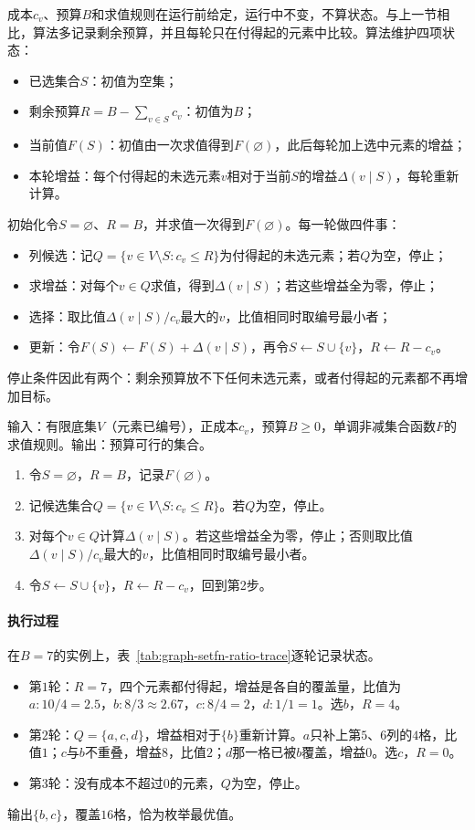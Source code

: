成本$c_v$、预算$B$和求值规则在运行前给定，运行中不变，不算状态。与上一节相比，算法多记录剩余预算，并且每轮只在付得起的元素中比较。算法维护四项状态：
\begin{itemize}
  \item 已选集合$S$：初值为空集；
  \item 剩余预算$R=B-\sum_{v\in S}c_v$：初值为$B$；
  \item 当前值$F(S)$：初值由一次求值得到$F(\varnothing)$，此后每轮加上选中元素的增益；
  \item 本轮增益：每个付得起的未选元素$v$相对于当前$S$的增益$\Delta(v\mid S)$，每轮重新计算。
\end{itemize}
初始化令$S=\varnothing$、$R=B$，并求值一次得到$F(\varnothing)$。每一轮做四件事：
\begin{itemize}
  \item 列候选：记$Q=\{v\in V\setminus S:c_v\leq R\}$为付得起的未选元素；若$Q$为空，停止；
  \item 求增益：对每个$v\in Q$求值，得到$\Delta(v\mid S)$；若这些增益全为零，停止；
  \item 选择：取比值$\Delta(v\mid S)/c_v$最大的$v$，比值相同时取编号最小者；
  \item 更新：令$F(S)\gets F(S)+\Delta(v\mid S)$，再令$S\gets S\cup\{v\}$，$R\gets R-c_v$。
\end{itemize}
停止条件因此有两个：剩余预算放不下任何未选元素，或者付得起的元素都不再增加目标。

\begin{algorithm}[预算约束下的单位成本贪心]
\label{alg:graph-setfn-ratio-greedy}
输入：有限底集$V$（元素已编号），正成本$c_v$，预算$B\geq0$，单调非减集合函数$F$的求值规则。输出：预算可行的集合。
\begin{enumerate}
  \item 令$S=\varnothing$，$R=B$，记录$F(\varnothing)$。
  \item 记候选集合$Q=\{v\in V\setminus S:c_v\leq R\}$。若$Q$为空，停止。
  \item 对每个$v\in Q$计算$\Delta(v\mid S)$。若这些增益全为零，停止；否则取比值$\Delta(v\mid S)/c_v$最大的$v$，比值相同时取编号最小者。
  \item 令$S\leftarrow S\cup\{v\}$，$R\leftarrow R-c_v$，回到第2步。
\end{enumerate}
\end{algorithm}

\paragraph{执行过程}
在$B=7$的实例上，表~\ref{tab:graph-setfn-ratio-trace}逐轮记录状态。
\begin{itemize}
  \item 第$1$轮：$R=7$，四个元素都付得起，增益是各自的覆盖量，比值为$a{:}10/4=2.5$，$b{:}8/3\approx2.67$，$c{:}8/4=2$，$d{:}1/1=1$。选$b$，$R=4$。
  \item 第$2$轮：$Q=\{a,c,d\}$，增益相对于$\{b\}$重新计算。$a$只补上第$5$、$6$列的$4$格，比值$1$；$c$与$b$不重叠，增益$8$，比值$2$；$d$那一格已被$b$覆盖，增益$0$。选$c$，$R=0$。
  \item 第$3$轮：没有成本不超过$0$的元素，$Q$为空，停止。
\end{itemize}
输出$\{b,c\}$，覆盖$16$格，恰为枚举最优值。

